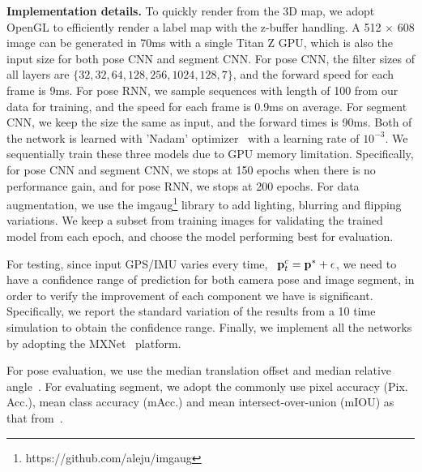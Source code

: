 \textbf{Implementation details.} To quickly render from the 3D map, we adopt OpenGL to efficiently render a label map with the z-buffer handling. A 512 $\times$ 608 image can be generated in 70ms with a single Titan Z GPU, which is also the input size for both pose CNN and segment CNN. 
For pose CNN, the filter sizes of all layers are $\{32, 32, 64, 128, 256, 1024, 128, 7\}$, and the forward speed for each frame is 9ms. For pose RNN, we sample sequences with length of 100 from our data for training, and the speed for each frame is 0.9ms on average.
For segment CNN, we keep the size the same as input, and the forward times is 90ms. 
Both of the network is learned with 'Nadam' optimizer~\cite{dozat2016incorporating} with a learning rate of $10^{-3}$. We sequentially train these three models due to GPU memory limitation.
Specifically, for pose CNN and segment CNN, we stops at 150 epochs when there is no performance gain, and for pose RNN, we stops at 200 epochs. For data augmentation, we use the imgaug\footnote{https://github.com/aleju/imgaug} library to add lighting, blurring and flipping variations. We keep a subset from training images for validating the trained model from each epoch, and choose the model performing best for evaluation.

For testing, since input GPS/IMU varies every time, \ie~${\mathbf p}_t^c={\mathbf p}^*+\epsilon$, we need to have a confidence range of prediction for both camera pose and image segment, in order to verify the improvement of each component we have is significant. Specifically, we report the standard variation of the results from a 10 time simulation to obtain the confidence range. Finally, we implement all the networks by adopting the MXNet~\cite{ChenLLLWWXXZZ15} platform.

For pose evaluation, we use the median translation offset and median relative angle~\cite{Kendall_2015_ICCV}. For evaluating segment, we adopt the commonly use pixel accuracy (Pix. Acc.), mean class accuracy (mAcc.) and mean intersect-over-union (mIOU) as that from~\cite{WuSH16e}.

